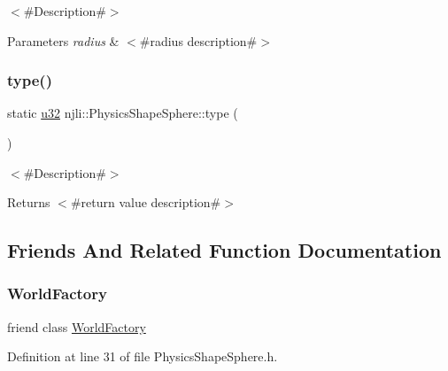 $<$\#\+Description\#$>$


\begin{DoxyParams}{Parameters}
{\em radius} & $<$\#radius description\#$>$ \\
\hline
\end{DoxyParams}
\mbox{\label{classnjli_1_1_physics_shape_sphere_abb7e873d046cf4470ac7c9b5242d8088}} 
\subsubsection{\texorpdfstring{type()}{type()}}
{\footnotesize\ttfamily static \mbox{\hyperlink{_util_8h_a10e94b422ef0c20dcdec20d31a1f5049}{u32}} njli\+::\+Physics\+Shape\+Sphere\+::type (\begin{DoxyParamCaption}{ }\end{DoxyParamCaption})\hspace{0.3cm}{\ttfamily [static]}}

$<$\#\+Description\#$>$

\begin{DoxyReturn}{Returns}
$<$\#return value description\#$>$ 
\end{DoxyReturn}


\subsection{Friends And Related Function Documentation}
\mbox{\label{classnjli_1_1_physics_shape_sphere_acb96ebb09abe8f2a37a915a842babfac}} 
\subsubsection{\texorpdfstring{World\+Factory}{WorldFactory}}
{\footnotesize\ttfamily friend class \mbox{\hyperlink{classnjli_1_1_world_factory}{World\+Factory}}\hspace{0.3cm}{\ttfamily [friend]}}



Definition at line 31 of file Physics\+Shape\+Sphere.\+h.



